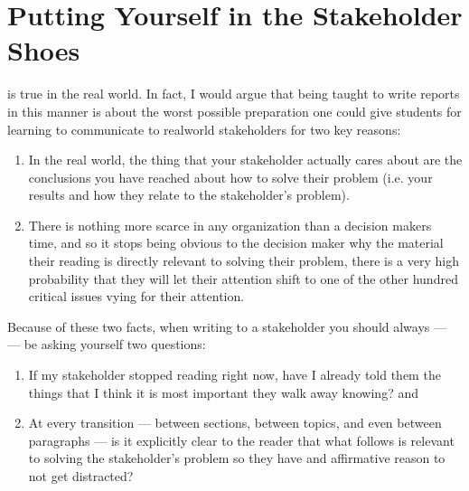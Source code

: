 \documentclass[letterpaper,10pt,english]{jupyterBook}
\begin{document}
\section{Putting Yourself in the Stakeholder Shoes}
\label{\detokenize{40_in_practice/25_writing_to_stakeholders:putting-yourself-in-the-stakeholder-shoes}}
\sphinxAtStartPar
{} is true in the real world. In fact, I would argue that being taught to write reports in this manner is about the worst possible preparation one could give students for learning to communicate to real\sphinxhyphen{}world stakeholders for two key reasons:
\begin{enumerate}
%
\item {} 
\sphinxAtStartPar
In the real world, the  thing that your stakeholder actually cares about are the conclusions you have reached about how to solve their problem (i.e. your results and how they relate to the stakeholder’s problem).

\item {} 
\sphinxAtStartPar
There is nothing more scarce in any organization than a decision makers time, and so  it stops being obvious to the decision maker why the material their reading is directly relevant to solving their problem, there is a very high probability that they will let their attention shift to one of the other hundred critical issues vying for their attention.

\end{enumerate}

\sphinxAtStartPar
Because of these two facts, when writing to a stakeholder you should always —  — be asking yourself two questions:
\begin{enumerate}
%
\item {} 
\sphinxAtStartPar
If my stakeholder stopped reading right now, have I already told them the things that I think it is most important they walk away knowing? and

\item {} 
\sphinxAtStartPar
At every transition — between sections, between topics, and even between paragraphs — is it explicitly clear to the reader that what follows is relevant to solving the stakeholder’s problem so they have and affirmative reason to not get distracted?

\end{enumerate}
\end{document}
